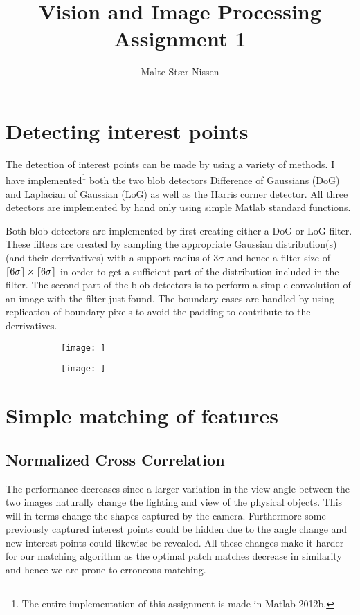 \documentclass[11pt,a4paper]{article}
\title{Vision and Image Processing\\Assignment 1}
\author{Malte Stær Nissen}
\DeclarePairedDelimiter{\ceil}{\lceil}{\rceil}
\begin{document}
\maketitle

\section{Detecting interest points}

The detection of interest points can be made by using a variety of methods. I
have implemented\footnote{The entire implementation of this assignment is made
in Matlab 2012b.} both the two blob detectors Difference of Gaussians (DoG) and
Laplacian of Gaussian (LoG) as well as the Harris corner detector. All three detectors
are implemented by hand only using simple Matlab standard functions.

Both blob detectors are implemented by first creating either a DoG or LoG
filter. These filters are created by sampling the appropriate Gaussian
distribution(s) (and their derrivatives) with a support radius of $3\sigma$
and hence a filter size of $\ceil{6 \sigma} \times \ceil{6\sigma}$ in order to
get a sufficient part of the distribution included in the filter. The second
part of the blob detectors is to perform a simple convolution of an image with
the filter just found. The boundary cases are handled by using replication of
boundary pixels to avoid the padding to contribute to the derrivatives.

\begin{figure}
    \begin{subfigure}[t]{0.5\textwidth}
        \texttt{[image: ]}
        \caption{}
        \label{fig:1a}
    \end{subfigure}
    \begin{subfigure}[t]{0.5\textwidth}
        \texttt{[image: ]}
        \caption{}
        \label{fig:2b}
    \end{subfigure}
    \caption{}
    \label{fig:1}
\end{figure}

\section{Simple matching of features}

\subsection{Normalized Cross Correlation}

The performance decreases since a larger variation in the view angle between
the two images naturally change the lighting and view of the physical objects.
This will in terms change the shapes captured by the camera. Furthermore some
previously captured interest points could be hidden due to the angle change
and new interest points could likewise be revealed. All these changes make it
harder for our matching algorithm as the optimal patch matches decrease in
similarity and hence we are prone to erroneous matching.
\end{document}
